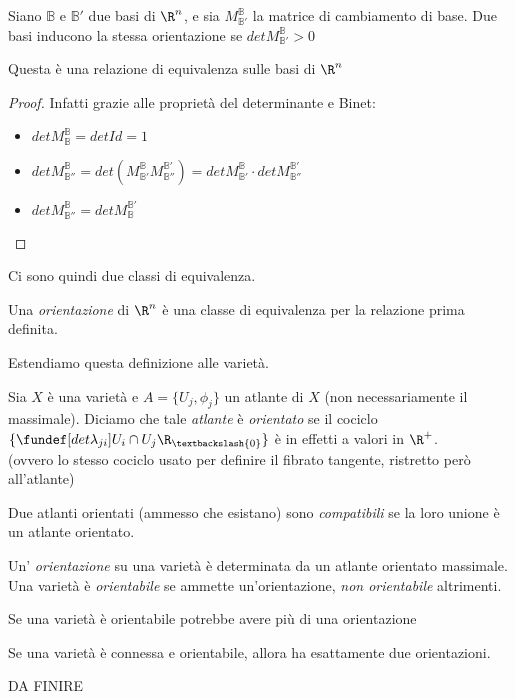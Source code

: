 
Siano $\mathbb{B}$ e $\mathbb{B'}$ due basi di $\R^n$, e sia $M^{\mathbb{B}}_{\mathbb{B'}}$ la matrice di cambiamento di base.
Due basi inducono la stessa orientazione se $det M^{\mathbb{B}}_{\mathbb{B'}}>0$

\begin{prop}
Questa è una relazione di equivalenza sulle basi di $\R^n$
\end{prop}
\begin{proof}
Infatti grazie alle proprietà del determinante e Binet:
\begin{itemize}
\item $det M^{\mathbb{B}}_{\mathbb{B}} = det Id = 1$
\item $det M^{\mathbb{B}}_{\mathbb{B''}} = det ( M^{\mathbb{B}}_{\mathbb{B'}}  M^{\mathbb{B'}}_{\mathbb{B''}})= det  M^{\mathbb{B}}_{\mathbb{B'}} \cdot det  M^{\mathbb{B'}}_{\mathbb{B''}}$
\item $det M^{\mathbb{B}}_{\mathbb{B''}} = det  M^{\mathbb{B'}}_{\mathbb{B}}$
\end{itemize}
\end{proof}

Ci sono quindi due classi di equivalenza.

\begin{defn}[Orientazione]
Una \emph{orientazione} di $\R^n$ è una classe di equivalenza per la relazione prima definita.
\end{defn}

Estendiamo questa definizione alle varietà.

\begin{defn}
Sia $X$ è una varietà e $A = \{U_j, \phi_j\}$ un atlante di $X$ (non necessariamente il massimale). Diciamo che tale \emph{atlante} è \emph{orientato} se il cociclo $\{\fundef[det \lambda_{ji}]{U_i \cap U_j}{\R_{\textbackslash\{0\}}}\}$ è in effetti a valori in $\R^+$.\\(ovvero lo stesso cociclo usato per definire il fibrato tangente, ristretto però all'atlante)
\end{defn}

\begin{defn}
Due atlanti orientati (ammesso che esistano) sono \emph{compatibili} se la loro unione è un atlante orientato.
\end{defn}

\begin{defn}
Un' \emph{orientazione} su una varietà è determinata da un atlante orientato massimale. Una varietà è \emph{orientabile} se ammette un'orientazione, \emph{non orientabile} altrimenti.
\end{defn}

\begin{oss}
Se una varietà è orientabile potrebbe avere più di una orientazione
\end{oss}

\begin{prop}
Se una varietà è connessa e orientabile, allora ha esattamente due orientazioni.
\end{prop}

DA FINIRE


